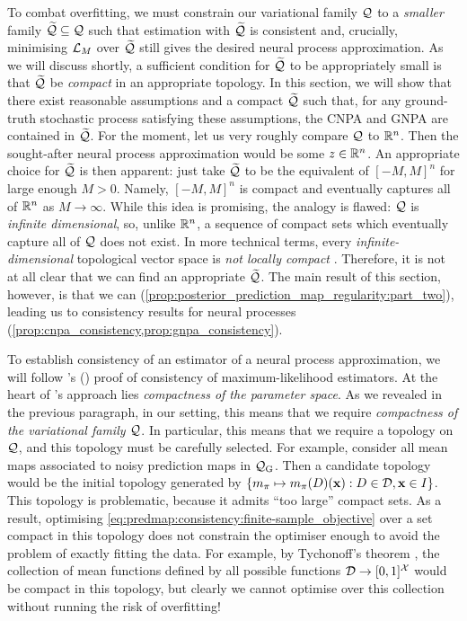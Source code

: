 \documentclass[12pt, twoside]{report}
\begin{document}
To combat overfitting, we must constrain our variational family $\mathcal{Q}$ to a \emph{smaller} family $\widetilde{\mathcal{Q}} \subseteq \mathcal{Q}$ such that estimation with $\widetilde{\mathcal{Q}}$ is consistent and, crucially, minimising $\mathcal{L}_M$ over $\widetilde{\mathcal{Q}}$ still gives the desired neural process approximation.
As we will discuss shortly, a sufficient condition for $\widetilde{\mathcal{Q}}$ to be appropriately small is that $\widetilde{\mathcal{Q}}$ be \emph{compact} in an appropriate topology.
In this section, we will show that there exist reasonable assumptions and a compact $\widetilde{\mathcal{Q}}$ such that, for any ground-truth stochastic process satisfying these assumptions, the CNPA and GNPA are contained in $\widetilde{\mathcal{Q}}$.
For the moment, let us very roughly compare $\mathcal{Q}$ to $\mathbb{R}^n$. 
Then the sought-after neural process approximation would be some $z \in \mathbb{R}^n$.
An appropriate choice for $\widetilde{\mathcal{Q}}$ is then apparent:
just take $\widetilde{\mathcal{Q}}$ to be the equivalent of $[-M, M]^n$ for large enough $M > 0$.
Namely, $[-M, M]^n$ is compact and eventually captures all of $\mathbb{R}^n$ as $M \to \infty$.
While this idea is promising, the analogy is flawed:
$\mathcal{Q}$ is \emph{infinite dimensional}, so, unlike $\mathbb{R}^n$, a sequence of compact sets which eventually capture all of $\mathcal{Q}$ does not exist. 
In more technical terms, every \emph{infinite-dimensional} topological vector space is \emph{not locally compact} \parencite[Theorem 1.22;][]{Rudin:1991:Functional_Analysis}.
Therefore, it is not at all clear that we can find an appropriate $\widetilde{\mathcal{Q}}$.
The main result of this section, however, is that we can (\cref{prop:posterior_prediction_map_regularity:part_two}),
leading us to consistency results for neural processes (\cref{prop:cnpa_consistency,prop:gnpa_consistency}).

To establish consistency of an estimator of a neural process approximation, we will follow \citeauthor{Wald:1949:Note_on_the_Consistency_of}'s (\citeyear{Wald:1949:Note_on_the_Consistency_of}) proof of consistency of maximum-likelihood estimators.
At the heart of \citeauthor{Wald:1949:Note_on_the_Consistency_of}'s approach lies \emph{compactness of the parameter space}.
As we revealed in the previous paragraph, in our setting, this means that we require \emph{compactness of the variational family $\mathcal{Q}$}.
In particular, this means that we require a topology on $\mathcal{Q}$, and this topology must be carefully selected.
For example, consider all mean maps associated to noisy prediction maps in $\Qc\ss{G}$.
Then a candidate topology would be the initial topology generated by $\{m_\pi \mapsto m_\pi(D)(\mathbf{x}) : D \in \mathcal{D}, \mathbf{x} \in I\}$.
This topology is problematic, because it admits ``too large'' compact sets.
As a result, optimising \eqref{eq:predmap:consistency:finite-sample_objective} over a set compact in this topology does not constrain the optimiser enough to avoid the problem of exactly fitting the data.
For example, by Tychonoff's theorem \parencite[Theorem 37.3;][]{Munkres:2000:Topology}, the collection of mean functions defined by all possible functions $\mathcal{D} \to [0, 1]^{\mathcal{X}}$ would be compact in this topology, but clearly we cannot optimise over this collection without running the risk of overfitting!
\end{document}
